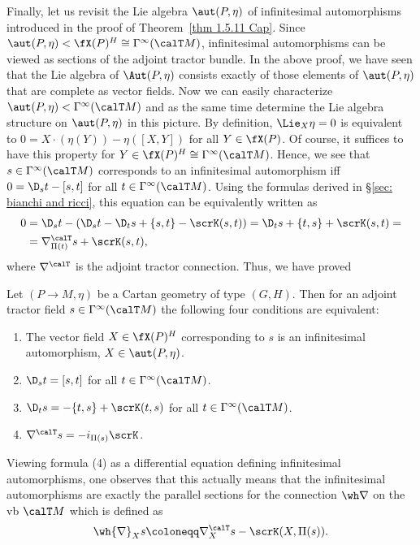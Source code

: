 Finally, let us revisit the Lie algebra $\aut(P,\eta)$ of infinitesimal automorphisms introduced in the proof of Theorem~\ref{thm 1.5.11 Cap}. Since $\aut(P,\eta)<\fX(P)^H\cong\Gamma^\infty(\calT M)$, infinitesimal automorphisms can be viewed as sections of the adjoint tractor bundle. In the above proof, we have seen that the Lie algebra of $\Aut(P,\eta)$ consists exactly of those elements of $\aut(P,\eta)$ that are complete as vector fields. Now we can easily characterize $\aut(P,\eta)<\Gamma^\infty(\calT M)$ and as the same time determine the Lie algebra structure on $\aut(P,\eta)$ in this picture. By definition, $\Lie_X \eta=0$ is equivalent to $0=X\cdot(\eta(Y))-\eta([X,Y])$ for all $Y\in\fX(P)$. Of course, it suffices to have this property for $Y\in \fX(P)^H\cong \Gamma^\infty(\calT M)$. Hence, we see that $s\in\Gamma^\infty(\calT M)$ corresponds to an infinitesimal automorphism iff $0=\D_s t-[s,t]$ for all $t\in\Gamma^\infty(\calT M)$. Using the formulas derived in \S\ref{sec: bianchi and ricci}, this equation can be equivalently written as 
\begin{align}
    0&=\D_s t-(\D_s t-\D_t s+\{s,t\}-\scrK(s,t))=\D_t s+\{t,s\}+\scrK(s,t)=\\
    &=\nabla^\calT_{\Pi(t)}s+\scrK(s,t),
\end{align}
where $\nabla^\calT$ is the adjoint tractor connection. Thus, we have proved 

\begin{lem}\label{lem 1.5.12 Cap}
    Let $(P\to M,\eta)$ be a Cartan geometry of type $(G,H)$. Then for an adjoint tractor field $s\in\Gamma^\infty(\calT M)$ the following four conditions are equivalent:
    \begin{enumerate}[label=(\arabic*)]
        \item The vector field $X\in\fX(P)^H$ corresponding to $s$ is an infinitesimal automorphism, $X\in\aut(P,\eta)$.
        \item $\D_s t=[s,t]$ for all $t\in\Gamma^\infty(\calT M)$.
        \item $\D_t s=-\{t,s\}+\scrK(t,s)$ for all $t\in\Gamma^\infty(\calT M)$.
        \item $\nabla^\calT s=-i_{\Pi(s)}\scrK$.
    \end{enumerate}
\end{lem}

Viewing formula (4) as a differential equation defining infinitesimal automorphisms, one observes that this actually means that the infinitesimal automorphisms are exactly the parallel sections for the connection $\wh\nabla$ on the \gls{vb} $\calT M$ which is defined as \[\wh{\nabla}_X s\coloneqq \nabla^\calT_X s-\scrK(X,\Pi(s)).\]

